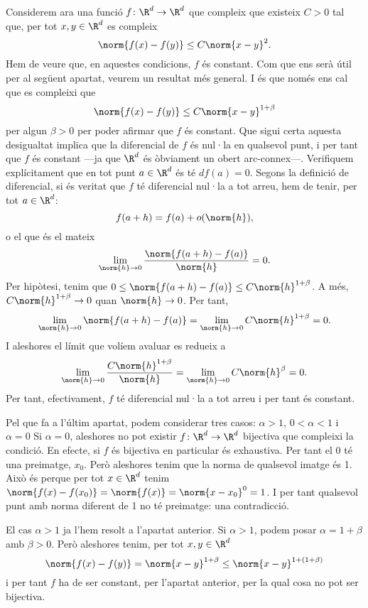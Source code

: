 \documentclass[12pt]{article}
\begin{document}
\bigskip
Considerem ara una funció \( f \colon \R^d \to \R^d \) que compleix que existeix \( C > 0 \) tal que, per tot \( x, y \in \R^d \) es compleix
\[ \norm{f(x) - f(y)} \leq C\norm{x - y}^2. \]
Hem de veure que, en aquestes condicions, \( f \) és constant. Com que ens serà útil per al següent apartat, veurem un resultat més general. I és que només ens cal que es compleixi que 
\[ \norm{f(x) - f(y)} \leq C\norm{x - y}^{1 + \beta} \]
per algun \( \beta > 0 \) per poder afirmar que \( f \) és constant. Que sigui certa aquesta desigualtat implica que la diferencial de \( f \) és nul·la en qualsevol punt, i per tant que \( f \) és constant ---ja que \( \R^d \) és òbviament un obert arc-connex---. Verifiquem explícitament que en tot punt \( a \in \R^d \) és té \( df(a) = 0 \). Segons la definició de diferencial, si és veritat que \( f \) té diferencial nul·la a tot arreu, hem de tenir, per tot \( a \in \R^d \):
\begin{equation*}
  f(a + h) = f(a) + o(\norm{h}),
\end{equation*}
o el que és el mateix
\begin{equation*}
  \lim_{\norm{h} \to 0}{\dfrac{\norm{f(a+h) - f(a)}}{\norm{h}}} = 0.
\end{equation*}
Per hipòtesi, tenim que \( 0 \leq \norm{f(a + h) -f(a)} \leq C \norm{h}^{1 + \beta} \). A més, \( C \norm{h}^{1+\beta} \to 0 \) quan \( \norm{h} \to 0 \). Per tant,
\[ \lim_{\norm{h} \to 0}{\norm{f(a + h) - f(a)}} = \lim_{\norm{h} \to 0}{C \norm{h}^{1 + \beta}} = 0. \]
I aleshores el límit que volíem avaluar es redueix a
\[ \lim_{\norm{h} \to 0}{\dfrac{C \norm{h}^{1 + \beta}}{\norm{h}}} = \lim_{\norm{h} \to 0}{C \norm{h}^{\beta}} = 0. \]
Per tant, efectivament, \( f \) té diferencial nul·la a tot arreu i per tant és constant.

\bigskip
Pel que fa a l'últim apartat, podem considerar tres casos: \( \alpha > 1 \), \( 0 < \alpha < 1 \) i \( \alpha = 0 \)
Si \( \alpha = 0 \), aleshores no pot existir \( f \colon \R^d \to \R^d \) bijectiva que compleixi la condició. En efecte, si \( f \) és bijectiva en particular és exhaustiva. Per tant el 0 té una preimatge, \( x_0 \). Però aleshores tenim que la norma de qualsevol imatge és 1. Això és perque per tot \( x \in \R^d \) tenim \( \norm{f(x) - f(x_0)} = \norm{f(x)} = \norm{x - x_0}^0	= 1 \). I per tant qualsevol punt amb norma diferent de 1 no té preimatge: una contradicció.

El cas \( \alpha > 1 \) ja l'hem resolt a l'apartat anterior. Si \( \alpha > 1 \), podem posar \( \alpha = 1 + \beta \) amb \( \beta > 0 \). Però aleshores tenim, per tot \( x, y \in \R^d \)
\[ \norm{f(x) - f(y)} = \norm{x - y}^{1 + \beta} \leq \norm{x - y}^{1 + (1+\beta)} \]
i per tant \( f \) ha de ser constant, per l'apartat anterior, per la qual cosa no pot ser bijectiva. 
\end{document}
